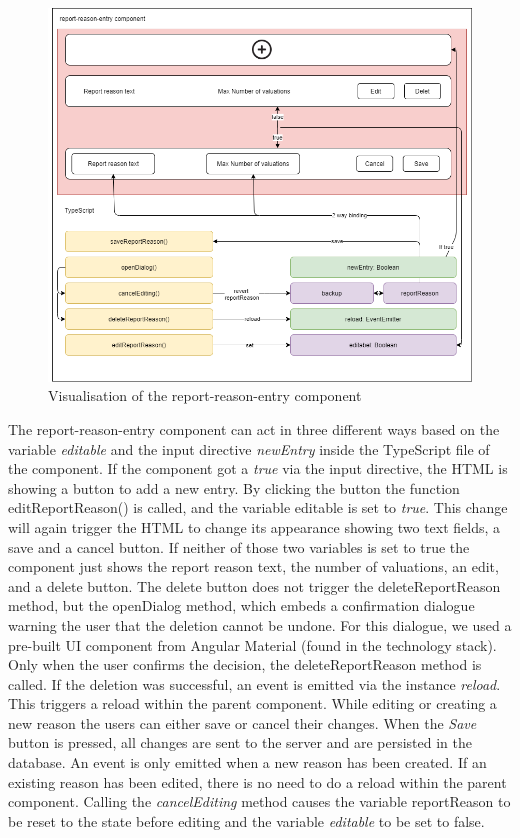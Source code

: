 \begin{figure}[H]
    \centering
    \includegraphics[width=1.0\textwidth]{./images/report_reason_entry_3}
    \caption{Visualisation of the report-reason-entry component}
    \label{fig:reportreasonent}
\end{figure}
\vspace{5mm}

The report-reason-entry component can act in three different ways based on the variable \textit{editable} and the input
directive \textit{newEntry} inside the TypeScript file of the component.
If the component got a \textit{true} via the input directive, the HTML is showing a button to add a new entry.
By clicking the button the function editReportReason() is called, and the variable editable is set to \textit{true}.
This change will again trigger the HTML to change its appearance showing two text fields, a save and a cancel button.
If neither of those two variables is set to true the component just shows the report reason text, the number of
valuations, an edit, and a delete button.
The delete button does not trigger the deleteReportReason method, but the openDialog method, which embeds a confirmation
dialogue warning the user that the deletion cannot be undone.
For this dialogue, we used a pre-built UI component from Angular Material (found in the technology stack).
Only when the user confirms the decision, the deleteReportReason method is called.
If the deletion was successful, an event is emitted via the instance \textit{reload}.
This triggers a reload within the parent component.
While editing or creating a new reason the users can either save or cancel their changes.
When the \textit{Save} button is pressed, all changes are sent to the server and are persisted in the database.
An event is only emitted when a new reason has been created.
If an existing reason has been edited, there is no need to do a reload within the parent component.
Calling the \textit{cancelEditing} method causes the variable reportReason to be reset to the state before editing and
the variable \textit{editable} to be set to false.

